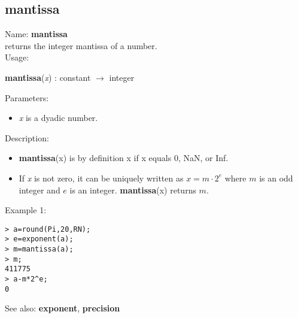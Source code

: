 \subsection{ mantissa }
\noindent Name: \textbf{mantissa}\\
returns the integer mantissa of a number.\\

\noindent Usage: 
\begin{center}
\textbf{mantissa}(\emph{x}) : \textsf{constant} $\rightarrow$ \textsf{integer}\\
\end{center}
Parameters: 
\begin{itemize}
\item \emph{x} is a dyadic number.
\end{itemize}
\noindent Description: \begin{itemize}

\item \textbf{mantissa}(x) is by definition x if x equals 0, NaN, or Inf.

\item If \emph{x} is not zero, it can be uniquely written as $x = m \cdot 2^e$ where
   $m$ is an odd integer and $e$ is an integer. \textbf{mantissa}(x) returns $m$. 
\end{itemize}
\noindent Example 1: 
\begin{center}\begin{minipage}{15cm}\begin{Verbatim}[frame=single]
> a=round(Pi,20,RN);
> e=exponent(a);
> m=mantissa(a);
> m;
411775
> a-m*2^e;
0
\end{Verbatim}
\end{minipage}\end{center}
See also: \textbf{exponent}, \textbf{precision}
